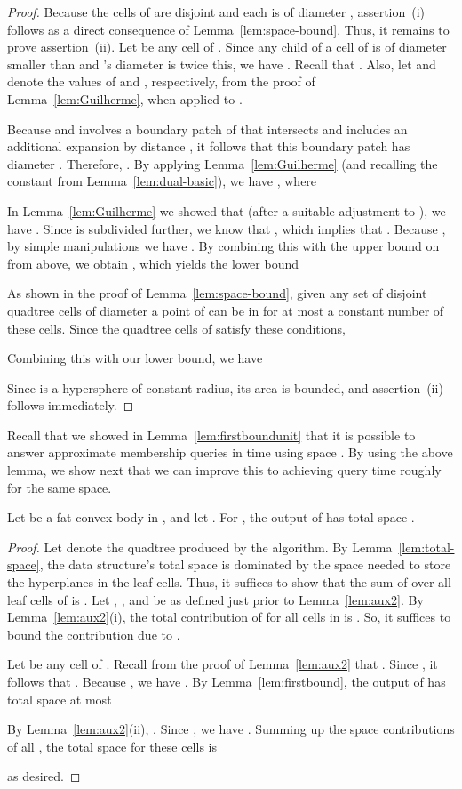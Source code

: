 \documentclass[11pt]{article}   \usepackage[letterpaper,hmargin=2.1cm,vmargin=3cm]{geometry}
\begin{document}
\begin{proof}
Because the cells of  are disjoint and each is of diameter , assertion~(i) follows as a direct consequence of Lemma~\ref{lem:space-bound}. Thus, it remains to prove assertion~(ii). Let  be any cell of . Since any child of a cell of  is of diameter smaller than  and 's diameter is twice this, we have . Recall that . Also, let  and  denote the values of  and , respectively, from the proof of Lemma~\ref{lem:Guilherme}, when applied to . 

Because  and  involves a boundary patch of  that intersects  and includes an additional expansion by distance , it follows that this boundary patch has diameter . Therefore, . By applying Lemma~\ref{lem:Guilherme} (and recalling the constant  from Lemma~\ref{lem:dual-basic}), we have , where

In Lemma~\ref{lem:Guilherme} we showed that (after a suitable adjustment to ), we have . Since  is subdivided further, we know that , which implies that . Because , by simple manipulations we have . By combining this with the upper bound on  from above, we obtain , which yields the lower bound


As shown in the proof of Lemma~\ref{lem:space-bound}, given any set of disjoint quadtree cells of diameter  a point of  can be in  for at most a constant number of these cells. Since the quadtree cells of  satisfy these conditions,

Combining this with our lower bound, we have

Since  is a hypersphere of constant radius, its area is bounded, and assertion~(ii) follows immediately.
\end{proof}


Recall that we showed in Lemma~\ref{lem:firstboundunit} that it is possible to answer approximate membership queries in  time using space . By using the above lemma, we show next that we can improve this to achieving query time roughly  for the same space.

\begin{lemma} \label{lem:baseunit}
Let  be a fat convex body in , and let . For , the output of  has total space .
\end{lemma}


\begin{proof}
Let  denote the quadtree produced by the algorithm. By Lemma~\ref{lem:total-space}, the data structure's total space is dominated by the space needed to store the hyperplanes in the leaf cells. Thus, it suffices to show that the sum of  over all leaf cells  of  is . Let , , and  be as defined just prior to Lemma~\ref{lem:aux2}. By Lemma~\ref{lem:aux2}(i), the total contribution of  for all cells in  is . So, it suffices to bound the contribution due to .

Let  be any cell of . Recall from the proof of Lemma~\ref{lem:aux2} that . Since , it follows that . Because , we have . By Lemma~\ref{lem:firstbound}, the output of  has total space at most 

By Lemma~\ref{lem:aux2}(ii), . Since , we have . Summing up the space contributions of all , the total space for these cells is 

as desired. 
\end{proof}
\end{document}
